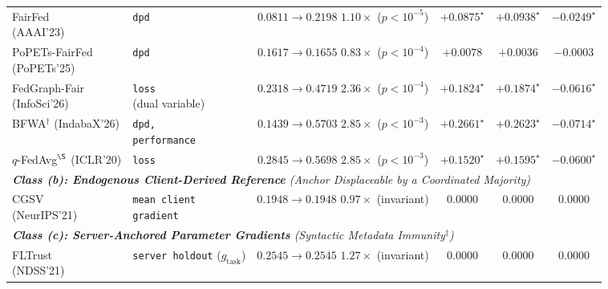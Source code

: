 \begin{table}[!t]
{\begin{tabular}{ll c ccc}
\makecell[l]{FairFed \\ \scriptsize (AAAI'23)} & \texttt{dpd} & \makecell{$0.0811 \to 0.2198$ \\ \scriptsize $1.10\times$ ($p < 10^{-5}$)} & $+0.0875^\star$ & $+0.0938^\star$ & $-0.0249^\star$ \\
\makecell[l]{PoPETs-FairFed \\ \scriptsize (PoPETs'25)} & \texttt{dpd} & \makecell{$0.1617 \to 0.1655$ \\ \scriptsize $0.83\times$ ($p < 10^{-4}$)} & $+0.0078$ & $+0.0036$ & $-0.0003$ \\
\makecell[l]{FedGraph-Fair \\ \scriptsize (InfoSci'26)} & \makecell[l]{\texttt{loss} \\ \scriptsize (dual variable)} & \makecell{$0.2318 \to 0.4719$ \\ \scriptsize $2.36\times$ ($p < 10^{-4}$)} & $+0.1824^\star$ & $+0.1874^\star$ & $-0.0616^\star$ \\
\makecell[l]{BFWA$^\dagger$ \\ \scriptsize (IndabaX'26)} & \makecell[l]{\texttt{dpd,} \\ \scriptsize \texttt{performance}} & \makecell{$0.1439 \to 0.5703$ \\ \scriptsize $2.85\times$ ($p < 10^{-3}$)} & $+0.2661^\star$ & $+0.2623^\star$ & $-0.0714^\star$ \\
\makecell[l]{$q$-FedAvg$^{\S}$ \\ \scriptsize (ICLR'20)} & \texttt{loss} & \makecell{$0.2845 \to 0.5698$ \\ \scriptsize $2.85\times$ ($p < 10^{-3}$)} & $+0.1520^\star$ & $+0.1595^\star$ & $-0.0600^\star$ \\
\midrule
\multicolumn{6}{l}{\textit{\textbf{Class (b): Endogenous Client-Derived Reference} (Anchor Displaceable by a Coordinated Majority)}} \\
\makecell[l]{CGSV \\ \scriptsize (NeurIPS'21)} & \makecell[l]{\texttt{mean client} \\ \scriptsize \texttt{gradient}} & \makecell{$0.1948 \to 0.1948$ \\ \scriptsize $0.97\times$ (invariant)} & $0.0000$ & $0.0000$ & $0.0000$ \\
\midrule
\multicolumn{6}{l}{\textit{\textbf{Class (c): Server-Anchored Parameter Gradients} (Syntactic Metadata Immunity$^\ddagger$)}} \\
\makecell[l]{FLTrust \\ \scriptsize (NDSS'21)} & \makecell[l]{\texttt{server holdout} \\ \scriptsize ($g_{\mathrm{task}}$)} & \makecell{$0.2545 \to 0.2545$ \\ \scriptsize $1.27\times$ (invariant)} & $0.0000$ & $0.0000$ & $0.0000$ \\

\end{tabular}}
\end{table}
